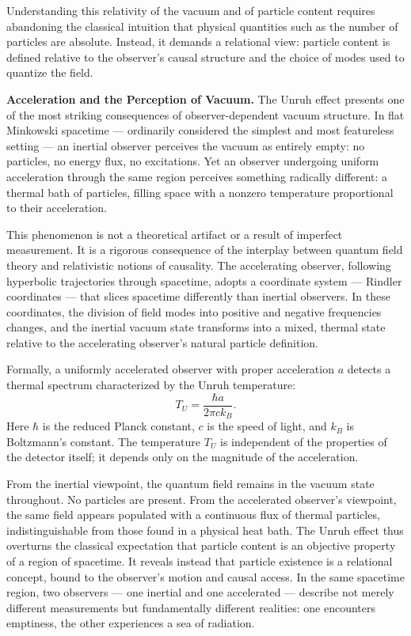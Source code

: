 Understanding this relativity of the vacuum and of particle content requires abandoning the classical intuition that physical quantities such as the number of particles are absolute. Instead, it demands a relational view: particle content is defined relative to the observer's causal structure and the choice of modes used to quantize the field.

\textbf{Acceleration and the Perception of Vacuum.} The Unruh effect presents one of the most striking consequences of observer-dependent vacuum structure. In flat Minkowski spacetime — ordinarily considered the simplest and most featureless setting — an inertial observer perceives the vacuum as entirely empty: no particles, no energy flux, no excitations. Yet an observer undergoing uniform acceleration through the same region perceives something radically different: a thermal bath of particles, filling space with a nonzero temperature proportional to their acceleration.

This phenomenon is not a theoretical artifact or a result of imperfect measurement. It is a rigorous consequence of the interplay between quantum field theory and relativistic notions of causality. The accelerating observer, following hyperbolic trajectories through spacetime, adopts a coordinate system — Rindler coordinates — that slices spacetime differently than inertial observers. In these coordinates, the division of field modes into positive and negative frequencies changes, and the inertial vacuum state transforms into a mixed, thermal state relative to the accelerating observer's natural particle definition.

Formally, a uniformly accelerated observer with proper acceleration $a$ detects a thermal spectrum characterized by the Unruh temperature:
\[
T_U = \frac{\hbar a}{2\pi c k_B}.
\]
Here $\hbar$ is the reduced Planck constant, $c$ is the speed of light, and $k_B$ is Boltzmann's constant. The temperature $T_U$ is independent of the properties of the detector itself; it depends only on the magnitude of the acceleration.

From the inertial viewpoint, the quantum field remains in the vacuum state throughout. No particles are present. From the accelerated observer's viewpoint, the same field appears populated with a continuous flux of thermal particles, indistinguishable from those found in a physical heat bath. The Unruh effect thus overturns the classical expectation that particle content is an objective property of a region of spacetime. It reveals instead that particle existence is a relational concept, bound to the observer’s motion and causal access. In the same spacetime region, two observers — one inertial and one accelerated — describe not merely different measurements but fundamentally different realities: one encounters emptiness, the other experiences a sea of radiation.

